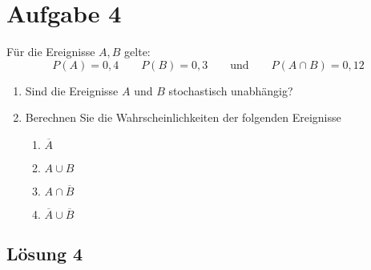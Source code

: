 \documentclass[main.tex]{subfiles}
\begin{document}
\section{Aufgabe 4}
Für die Ereignisse $A, B$ gelte:
$$
    P(A) = 0,4 \qquad P(B) = 0,3 \qquad \text{und} \qquad P(A\cap B) = 0,12
$$

\begin{enumerate}
    \item Sind die Ereignisse $A$ und $B$ stochastisch unabhängig?
    \item Berechnen Sie die Wahrscheinlichkeiten der folgenden Ereignisse
    \begin{enumerate}
        \item $\overline{A}$
        \item $A \cup B$
        \item $A \cap \overline{B}$
        \item $\overline{A} \cup \overline{B}$
    \end{enumerate}
\end{enumerate}

\subsection{Lösung 4}
\end{document}
